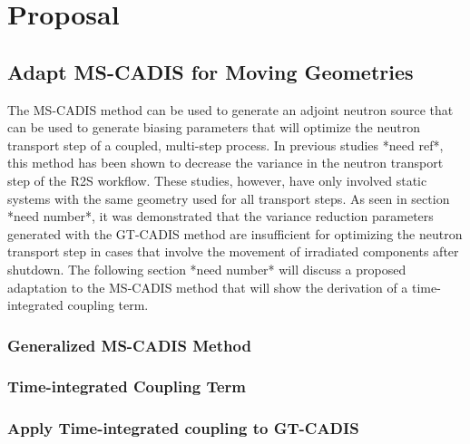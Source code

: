 \chapter{Proposal}\label{ch:proposal}

\section{Adapt MS-CADIS for Moving Geometries}\label{sec:adapt}
The MS-CADIS method can be used to generate an adjoint neutron source 
that can be used to generate biasing parameters that will optimize the neutron transport step of a coupled,
multi-step process. In previous studies *need ref*, this method has been shown to decrease
the variance in the neutron transport step of the R2S workflow.  These studies,
however, have only involved static systems with the same geometry used for all
transport steps.  
As seen in section *need number*, it was demonstrated that the variance
reduction parameters generated with the GT-CADIS method are insufficient for
optimizing the neutron transport step in cases that involve the movement 
of irradiated components after shutdown.  
The following section *need number* will discuss a proposed adaptation to the
MS-CADIS method that will show the derivation of a time-integrated coupling
term.

\subsection{Generalized MS-CADIS Method}

\subsection{Time-integrated Coupling Term}

\subsection{Apply Time-integrated coupling to GT-CADIS}


